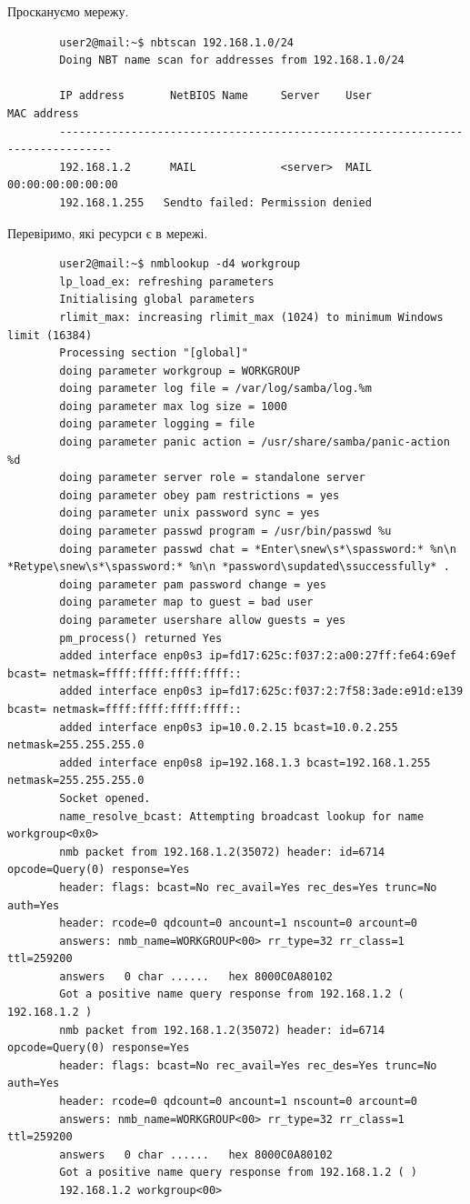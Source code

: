 \documentclass[14pt, a4paper]{extreport}
\begin{document}
	Проскануємо мережу. \sideat{[VM 2]}
	
	\begin{verbatim}
		user2@mail:~$ nbtscan 192.168.1.0/24
		Doing NBT name scan for addresses from 192.168.1.0/24
		
		IP address       NetBIOS Name     Server    User             MAC address      
		------------------------------------------------------------------------------
		192.168.1.2      MAIL             <server>  MAIL             00:00:00:00:00:00
		192.168.1.255   Sendto failed: Permission denied
	\end{verbatim}
	
	Перевіримо, які ресурси є в мережі. \sideat{[VM 2]}
	
	\begin{verbatim}
		user2@mail:~$ nmblookup -d4 workgroup
		lp_load_ex: refreshing parameters
		Initialising global parameters
		rlimit_max: increasing rlimit_max (1024) to minimum Windows limit (16384)
		Processing section "[global]"
		doing parameter workgroup = WORKGROUP
		doing parameter log file = /var/log/samba/log.%m
		doing parameter max log size = 1000
		doing parameter logging = file
		doing parameter panic action = /usr/share/samba/panic-action %d
		doing parameter server role = standalone server
		doing parameter obey pam restrictions = yes
		doing parameter unix password sync = yes
		doing parameter passwd program = /usr/bin/passwd %u
		doing parameter passwd chat = *Enter\snew\s*\spassword:* %n\n *Retype\snew\s*\spassword:* %n\n *password\supdated\ssuccessfully* .
		doing parameter pam password change = yes
		doing parameter map to guest = bad user
		doing parameter usershare allow guests = yes
		pm_process() returned Yes
		added interface enp0s3 ip=fd17:625c:f037:2:a00:27ff:fe64:69ef bcast= netmask=ffff:ffff:ffff:ffff::
		added interface enp0s3 ip=fd17:625c:f037:2:7f58:3ade:e91d:e139 bcast= netmask=ffff:ffff:ffff:ffff::
		added interface enp0s3 ip=10.0.2.15 bcast=10.0.2.255 netmask=255.255.255.0
		added interface enp0s8 ip=192.168.1.3 bcast=192.168.1.255 netmask=255.255.255.0
		Socket opened.
		name_resolve_bcast: Attempting broadcast lookup for name workgroup<0x0>
		nmb packet from 192.168.1.2(35072) header: id=6714 opcode=Query(0) response=Yes
		header: flags: bcast=No rec_avail=Yes rec_des=Yes trunc=No auth=Yes
		header: rcode=0 qdcount=0 ancount=1 nscount=0 arcount=0
		answers: nmb_name=WORKGROUP<00> rr_type=32 rr_class=1 ttl=259200
		answers   0 char ......   hex 8000C0A80102
		Got a positive name query response from 192.168.1.2 ( 192.168.1.2 )
		nmb packet from 192.168.1.2(35072) header: id=6714 opcode=Query(0) response=Yes
		header: flags: bcast=No rec_avail=Yes rec_des=Yes trunc=No auth=Yes
		header: rcode=0 qdcount=0 ancount=1 nscount=0 arcount=0
		answers: nmb_name=WORKGROUP<00> rr_type=32 rr_class=1 ttl=259200
		answers   0 char ......   hex 8000C0A80102
		Got a positive name query response from 192.168.1.2 ( )
		192.168.1.2 workgroup<00>
	\end{verbatim}
	
\end{document}
